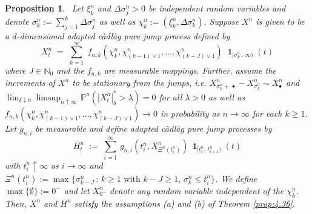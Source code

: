 \documentclass[11pt]{article}
\newtheorem{prop}[theorem]{Proposition}
\theoremstyle{definition}\newtheorem{example}[theorem]{Example}
\theoremstyle{definition}\newtheorem{counterexample}[theorem]{Counterexample}
\theoremstyle{definition}\newtheorem{remark}[theorem]{Remark}
\theoremstyle{definition}\newtheorem{defi}[theorem]{Definition}
\numberwithin{equation}{section}
\newcommand{\N}{\mathbb{N}}
\newcommand{\Pro}{\mathbb{P}}										%
\newcommand{\ind}{\operatorname{\mathbf{1}}}							%
\renewcommand{\|}{\; : \, \;}											%
\begin{document}
\begin{prop} \ \label{prop:finex}
	Let $\xi^n_k$ and $\Delta \sigma^n_j> 0$ be independent random variables and denote $\sigma^n_k:=\sum_{j=1}^k \Delta \sigma^n_j$ as well as $\chi^n_k:=(\xi^n_k,\Delta \sigma^n_k)$. Suppose $X^n$ is given to be a $d$-dimensional adapted càdlàg pure jump process defined by
	$$ X^n_t \; = \; \sum_{k=1}^\infty \; f_{n,k}(\chi^n_k,\chi^n_{(k-1)\vee 1},...,\chi^n_{(k-J)\vee 1}) \; \ind_{[\sigma^n_k\, ,\, \infty)}(t)$$
	where $J\in \N_0$ and the $f_{n,k}$ are measurable mappings. Further, assume the increments of $X^n$ to be stationary from the jumps, i.e. $X^n_{\sigma^n_k +\, \bullet}-X^n_{\sigma^n_k} \sim X^n_\bullet$ and \, $\lim_{\delta \downarrow 0} \limsup_{n\uparrow \infty} \, \Pro^n( |X^n_t|^*_\delta >\lambda) =0$ for all $\lambda>0$ as well as $f_{n,k}(\chi^n_k,\chi^n_{(k-1)\vee 1},...,\chi^n_{(k-J)\vee 1}) \to 0$ in probability as $n\to \infty$ for each $k\ge 1$. Let $g_{n,i}$ be measurable and define adapted càdlàg pure jump processes by
	\begin{equation}\label{eq:Hn_fin_application} H^n_t \; := \; \sum_{i=1}^{\infty} \, g_{n,i}(t^n_i,X^n_{ \Xi^n(t^n_i)}) \, \ind_{[t^n_i, \, t^n_{i+1})}(t)
	\end{equation}
	with $t^n_i\uparrow \infty$ as $i \to \infty$ and $\Xi^n(t^n_i):= \operatorname{max}\{\sigma^n_{k-J} \, : \, k\ge 1 \text{ with } k-J\ge 1, \, \sigma^n_k\le t^n_i\}$. We define $\operatorname{max}\{ \emptyset\}:=0^{-}$ and let $X^n_{0^{-}}$ denote any random variable independent of the $\chi^n_k$. \\
	Then, $X^n$ and $H^n$ satisfy the assumptions (a) and (b) of Theorem \ref{prop:4.36}. 
\end{prop}
\end{document}
